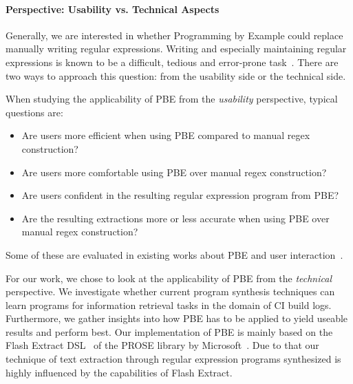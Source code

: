 \documentclass[\myrootdir/main.tex]{subfiles}
\begin{document}
\paragraph{Perspective: Usability vs. Technical Aspects}
Generally, we are interested in whether Programming by Example could replace manually writing regular expressions.
Writing and especially maintaining regular expressions is known to be a difficult, tedious and error-prone task~\cite{michael2019regexes}.
There are two ways to approach this question: from the usability side or the technical side.

When studying the applicability of PBE from the \emph{usability} perspective, typical questions are:
\begin{itemize}
	\item Are users more efficient when using PBE compared to manual regex construction?
	\item Are users more comfortable using PBE over manual regex construction?
	\item Are users confident in the resulting regular expression program from PBE?
	\item Are the resulting extractions more or less accurate when using PBE over manual regex construction?
\end{itemize}
Some of these are evaluated in existing works about PBE and user interaction~\cite{mayer2015user,lau2009why-programming-by-demonstration,miller2001outlier}.

For our work, we chose to look at the applicability of PBE from the \emph{technical} perspective.
We investigate whether current program synthesis techniques can learn programs for information retrieval tasks in the domain of CI build logs.
Furthermore, we gather insights into how PBE has to be applied to yield useable results and perform best.
Our implementation of PBE is mainly based on the Flash Extract DSL~\cite{le2014flashextract:} of the PROSE library by Microsoft~\cite{prose2019webpage}.
Due to that our technique of text extraction through regular expression programs synthesized is highly influenced by the capabilities of Flash Extract.
\end{document}
